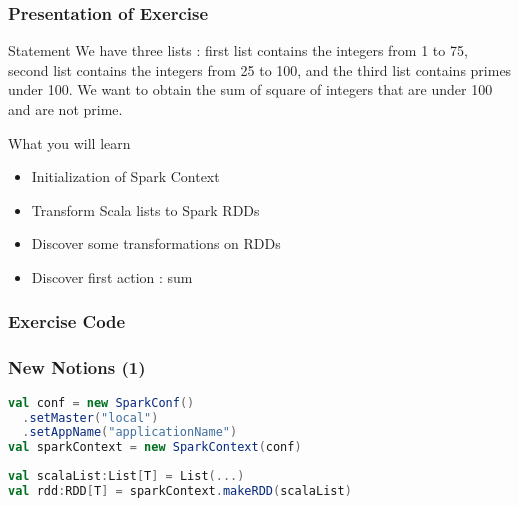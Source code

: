 \documentclass[slidetop,9pt,utf8]{beamer}
\begin{document}
\begin{CJK}{UTF8}{gbsn}
\begin{frame}
  \frametitle{Presentation of Exercise}

  \begin{block}{Statement}
    We have three lists : first list contains the integers from 1 to 75, second list contains the integers from 25 to 100, and the third list contains primes under 100. We want to obtain the sum of square of integers that are under 100 and are not prime.
  \end{block}

  \begin{block}{What you will learn}
    \begin{itemize}
      \item Initialization of Spark Context
      \item Transform Scala lists to Spark RDDs
      \item Discover some transformations on RDDs
      \item Discover first action : sum
    \end{itemize}
  \end{block}

\end{frame}

\begin{frame}
  \frametitle{Exercise Code}

  

\end{frame}

\begin{frame}[fragile]
  \frametitle{New Notions (1)}

  \begin{lstlisting}[label=InitSparkContext, caption=Init Spark Context, language=scala, style=code]
val conf = new SparkConf()
  .setMaster("local")
  .setAppName("applicationName")
val sparkContext = new SparkContext(conf)
  \end{lstlisting}

  \begin{lstlisting}[label=ListToRdd, caption=Load List as RDD, language=scala, style=code]
val scalaList:List[T] = List(...)
val rdd:RDD[T] = sparkContext.makeRDD(scalaList)
  \end{lstlisting}

\end{frame}


\end{CJK}
\end{document}
